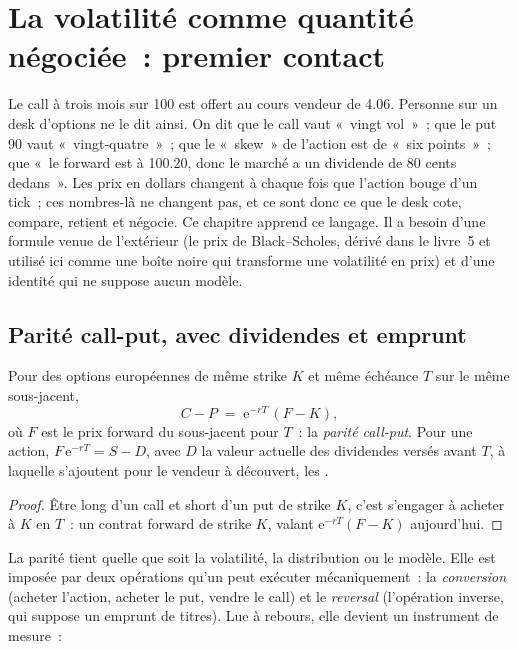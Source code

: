 \chapter{La volatilité comme quantité négociée~: premier contact}\label{ch:m1:volatility-first-contact}

Le call à trois mois sur 100 est offert au cours vendeur de 4.06. Personne sur un desk d'options ne le
dit ainsi. On dit que le call vaut «~vingt vol~»~; que le put 90 vaut «~vingt-quatre~»~;
que le «~skew~» de l'action est de «~six points~»~; que «~le forward est à 100.20, donc le
marché a un dividende de 80 cents dedans~». Les prix en dollars changent à chaque fois que
l'action bouge d'un tick~; ces nombres-là ne changent pas, et ce sont donc ce que le desk cote,
compare, retient et négocie. Ce chapitre apprend ce langage. Il a besoin
d'une formule venue de l'extérieur (le prix de Black--Scholes, dérivé dans le
livre~5 et utilisé ici comme une boîte noire qui transforme une volatilité en prix)
et d'une identité qui ne suppose aucun modèle.

\section{Parité call-put, avec dividendes et emprunt}

\begin{proposition}\label{prop:m1:volatility-first-contact:parity}
Pour des options européennes de même strike $K$ et même échéance $T$ sur le même
sous-jacent,
\[
C - P \;=\; \mathrm{e}^{-rT}\,(F - K),
\]
où $F$ est le prix forward du sous-jacent pour $T$~: la \emph{parité
call-put}. Pour une action, $F\,\mathrm{e}^{-rT} = S - D$,
avec $D$ la valeur actuelle des dividendes versés avant $T$, à laquelle s'ajoutent
pour le vendeur à découvert, les .
\end{proposition}
\begin{proof}
Être long d'un call et short d'un put de strike $K$, c'est s'engager à acheter à $K$ en $T$~: un
contrat forward de strike $K$, valant $\mathrm{e}^{-rT}(F-K)$ aujourd'hui.
\end{proof}

La parité tient quelle que soit la volatilité, la distribution ou le modèle. Elle est
imposée par deux opérations qu'un  peut exécuter mécaniquement~: la
\emph{conversion} (acheter l'action, acheter le put, vendre le call) et le
\emph{reversal} (l'opération inverse, qui suppose un emprunt de titres). Lue à rebours,
elle devient un instrument de mesure~:

